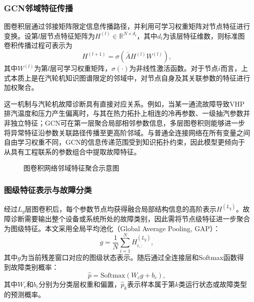 \subsubsection{GCN邻域特征传播}

图卷积层通过邻接矩阵限定信息传播路径，并利用可学习权重矩阵对节点特征进行变换。设第$l$层节点特征矩阵为$H^{(l)}\in\mathbb{R}^{N\times d_l}$，其中$d_l$为该层特征维数，则标准图卷积传播过程可表示为\cite{Kipf2017GCN}
\begin{equation}
    H^{(l+1)}=\sigma\left(\bar A H^{(l)}W^{(l)}\right),
\end{equation}
其中$W^{(l)}$为第$l$层可学习权重矩阵，$\sigma(\cdot)$为非线性激活函数。对于节点$i$而言，上式本质上是在汽轮机知识图谱限定的邻域中，对节点自身及其关联参数的特征进行加权聚合。

这一机制与汽轮机故障诊断具有直接对应关系。例如，当某一通流故障导致VHP排汽温度和压力产生偏离时，与其在热力拓扑上相连的冷再参数、一级抽汽参数并非独立特征；GCN可在第一层聚合局部相邻参数信息，多层图卷积则能够进一步将异常特征沿参数关联路径传播至更高阶邻域。与普通全连接网络在所有变量之间自由学习权重不同，GCN的信息传递范围受到知识拓扑约束，因此模型更倾向于从具有工程联系的参数组合中提取故障特征。

\begin{figure}[htbp]
    \centering
    \caption{图卷积网络邻域特征聚合示意图}
    \label{fig:gcn_message_passing}
\end{figure}

\subsubsection{图级特征表示与故障分类}

经过$L_g$层图卷积后，每个参数节点均获得融合局部结构信息的高阶表示$H^{(L_g)}$。故障诊断需要输出整个设备或系统所处的故障类别，因此需将节点级特征进一步聚合为图级特征。本文采用全局平均池化（Global Average Pooling, GAP）：
\begin{equation}
    g=\frac{1}{N}\sum_{i=1}^{N}H^{(L_g)}_{i,:},
\end{equation}
其中$g$为当前残差窗口对应的图级状态表示。随后通过全连接层和Softmax函数得到故障类别概率：
\begin{equation}
    \hat p=\mathrm{Softmax}(W_cg+b_c),
\end{equation}
其中$W_c$和$b_c$分别为分类层权重和偏置，$\hat p_k$表示样本属于第$k$类运行状态或故障类型的预测概率。

